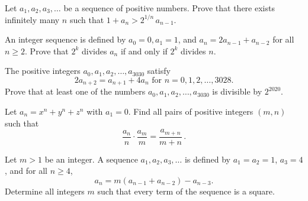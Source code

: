 \documentclass[11pt]{scrartcl}
\begin{document}
\begin{problem}
Let \(a_{1}, a_{2}, a_{3}, \ldots\) be a sequence of positive numbers. Prove that there exists infinitely many \(n\) such that \(1+a_{n}>2^{1 / n}\, a_{n-1}\).
\end{problem}
\begin{problem}[ISL 1988]
An integer sequence is defined by \(a_{0}=0, a_{1}=1\), and \(a_{n}=2 a_{n-1}+a_{n-2}\) for all \(n \geq 2\). Prove that \(2^{k}\) divides \(a_{n}\) if and only if \(2^{k}\) divides \(n\).
\end{problem}
\begin{problem}[EGMO 2020]
The positive integers $a_0, a_1, a_2, \ldots, a_{3030}$ satisfy$$2a_{n + 2} = a_{n + 1} + 4a_n \text{ for } n = 0, 1, 2, \ldots, 3028.$$
Prove that at least one of the numbers $a_0, a_1, a_2, \ldots, a_{3030}$ is divisible by $2^{2020}$.
\end{problem}
\begin{problem}[USAMO 1982]
Let \(a_n = x^n + y^n + z^n\) with \(a_1 = 0\). Find all pairs of positive integers \(\left(m,n\right) \) such that
\[ \frac{a_n}{n}\cdot \frac{a_m}{m} = \frac{a_{m+n}}{m+n}\, . \]
\end{problem}
\begin{problem}[EGMO 2020]
Let $m > 1$ be an integer. A sequence $a_1, a_2, a_3, \ldots$ is defined by $a_1 = a_2 = 1$, $a_3 = 4$, and for all $n \ge 4$,$$a_n = m(a_{n - 1} + a_{n - 2}) - a_{n - 3}.$$
Determine all integers $m$ such that every term of the sequence is a square.
\end{problem}
\end{document}
